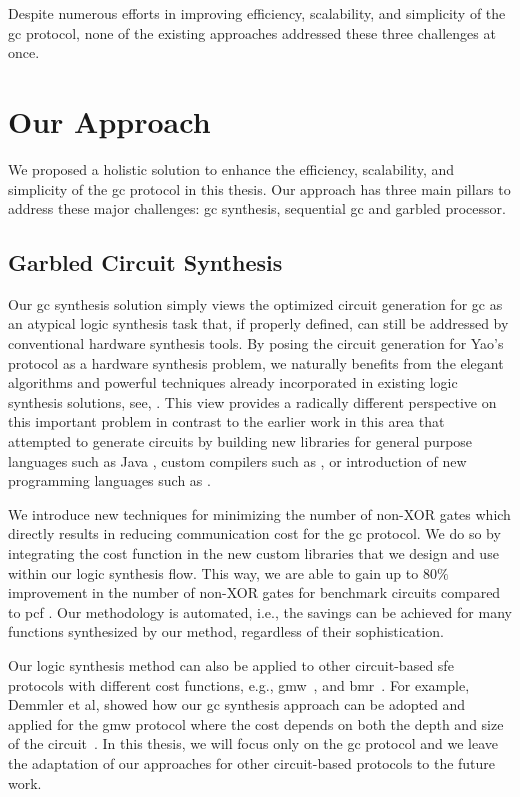 Despite numerous efforts in improving efficiency, scalability, and simplicity of the \acrshort{gc} protocol, none of the existing approaches addressed these three challenges at once.

\section{Our Approach}
We proposed a holistic solution to enhance the efficiency, scalability, and simplicity of the \acrshort{gc} protocol in this thesis.
Our approach has three main pillars to address these major challenges: \acrlong{gc} synthesis, sequential \acrlong{gc} and garbled processor.

\subsection{Garbled Circuit Synthesis}
Our \acrfull{gc} synthesis solution simply views the optimized circuit generation for \acrshort{gc} as an atypical logic synthesis task that, if properly defined, can still be addressed by conventional hardware synthesis tools.
By posing the circuit generation for Yao's protocol as a hardware synthesis problem, we naturally benefits from the elegant algorithms and powerful techniques already incorporated in existing logic synthesis solutions, see, \cite{sentovich1992sis,micheli1994synthesis,devadas1994logic,brayton1987mis}.
This view provides a radically different perspective on this important problem in contrast to the earlier work in this area that attempted to generate circuits by building new libraries for general purpose languages such as Java \cite{huang2011faster,malka2011vmcrypt}, custom compilers such as \cite{kreuter2013pcf,franz2014cbmc}, or introduction of new programming languages such as \cite{malkhi2004fairplay,rastogi2014wysteria}.

We introduce new techniques for minimizing the number of non-XOR gates which directly results in reducing communication cost for the \acrshort{gc} protocol.
We do so by integrating the cost function in the new custom libraries that we design and use within our logic synthesis flow.
This way, we are able to gain up to $80\%$ improvement in the number of non-XOR gates for benchmark circuits compared to \gls{pcf} \cite{kreuter2013pcf}.
Our methodology is automated, i.e., the savings can be achieved for many functions synthesized by our method, regardless of their sophistication.

Our logic synthesis method can also be applied to other circuit-based \acrshort{sfe} protocols with different cost functions, e.g., \acrfull{gmw}~\cite{goldreich1987play}, and \acrfull{bmr}~\cite{beaver1990round}.
For example, Demmler et al, showed how our \acrshort{gc} synthesis approach can be adopted and applied for the \acrshort{gmw} protocol where the cost depends on both the depth and size of the circuit~\cite{demmler2015automated}.
In this thesis, we will focus only on the \acrshort{gc} protocol and we leave the adaptation of our approaches for other circuit-based protocols to the future work.

